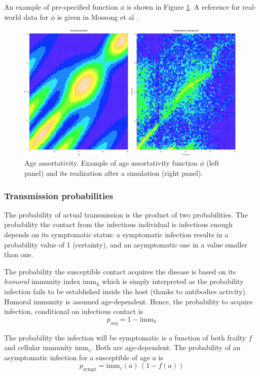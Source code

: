 \documentclass[11pt, onecolumn]{article}
\newcommand{\immh}{\ensuremath{\text{imm}_h}}
\newcommand{\immc}{\ensuremath{\text{imm}_c}}
\begin{document}
An example of pre-specified function $\phi$ is shown in Figure \ref{fig:age_assortativity}. A reference for real-world data for $\phi$ is given in Mossong et al \cite{Mossong:2008vz}.


\begin{figure}[!ht]
\centering
    \includegraphics[angle=0,width=0.99\textwidth]{figures/age_assort.png}
\caption{Age assortativity. Example of age assortativity function $\phi$ (left panel) and its realization after a simulation (right panel).}
\label{fig:age_assortativity}
\end{figure}



\subsubsection*{Transmission probabilities}

The probability of actual transmission is the product of two probabilities. The probability the contact from the infectious individual is infectious enough depends on its symptomatic status: a symptomatic infection results in a probability value of 1 (certainty), and an asymptomatic one in a value smaller than one. 

The probability the susceptible contact acquires the disease is based on its \emph{humoral} immunity index $\immh$ which is simply interpreted as the probability infection fails to be established inside the host (thanks to antibodies activity). Humoral immunity is assumed age-dependent. Hence, the probability to acquire infection, conditional on infectious contact is
\begin{equation}
p_{\text{acq}} = 1 - \immh
\end{equation}

The probability the infection will be symptomatic is a function of both frailty $f$ and cellular immunity \immc. Both are age-dependent. The probability of an asymptomatic infection for a susceptible of age $a$ is
\begin{equation}
p_{\text{sympt}} = \immc(a) \, (1-f(a))
\end{equation}
\end{document}
